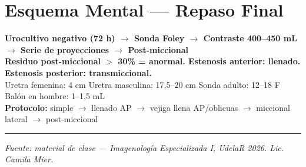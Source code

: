 \clearpage

\section*{Esquema Mental --- Repaso Final}

\begin{cajakeypoints}
\begin{center}
\textbf{\color{azulprincipal}
  Urocultivo negativo (72 h) $\rightarrow$ Sonda Foley $\rightarrow$ Contraste 400--450 mL $\rightarrow$ Serie de proyecciones $\rightarrow$ Post-miccional}\\[0.4em]
\textbf{\color{naranjadestacado}
  Residuo post-miccional $>$ 30\% = anormal. Estenosis anterior: llenado. Estenosis posterior: transmiccional.}\\[0.3em]
Uretra femenina: 4 cm \quad Uretra masculina: 17,5--20 cm \quad Sonda adulto: 12--18 F \quad Balón en hombre: 1--1,5 mL\\[0.3em]
\textbf{Protocolo:} simple $\to$ llenado AP $\to$ vejiga llena AP/oblicuas $\to$ miccional lateral $\to$ post-miccional
\end{center}
\end{cajakeypoints}

\vspace{1em}
\hrule
\vspace{0.5em}
{\footnotesize \textit{Fuente: material de clase --- Imagenología Especializada I, UdelaR 2026. Lic. Camila Mier.}}